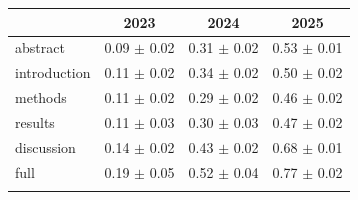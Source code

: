 \begin{tabular}{lrrr}
\toprule
 & \multicolumn{1}{c}{2023} & \multicolumn{1}{c}{2024} & \multicolumn{1}{c}{2025}\\
\midrule
abstract        & 0.09 $\pm$ 0.02 & 0.31 $\pm$ 0.02 & 0.53 $\pm$ 0.01 \\
\midrule
introduction    & 0.11 $\pm$ 0.02 & 0.34 $\pm$ 0.02 & 0.50 $\pm$ 0.02 \\
methods         & 0.11 $\pm$ 0.02 & 0.29 $\pm$ 0.02 & 0.46 $\pm$ 0.02 \\
results         & 0.11 $\pm$ 0.03 & 0.30 $\pm$ 0.03 & 0.47 $\pm$ 0.02 \\
discussion      & 0.14 $\pm$ 0.02 & 0.43 $\pm$ 0.02 & 0.68 $\pm$ 0.01 \\
\midrule
full            & 0.19 $\pm$ 0.05 & 0.52 $\pm$ 0.04 & 0.77 $\pm$ 0.02 \\
\bottomrule
\label{estimated LLM-usage per section}
\end{tabular}

